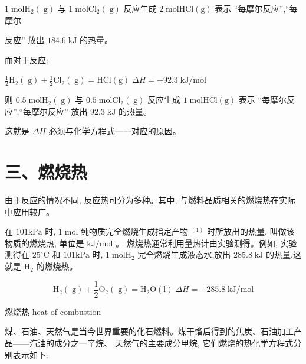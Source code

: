 \documentclass[10pt]{article}
\begin{document}
\(1\mathrm{\;{mol}}{\mathrm{H}}_{2}\left( \mathrm{\;g}\right)\) 与 \(1\mathrm{\;{mol}}{\mathrm{{Cl}}}_{2}\left( \mathrm{\;g}\right)\) 反应生成 \(2\mathrm{\;{mol}}\mathrm{{HCl}}\left( \mathrm{g}\right)\) 表示 “每摩尔反应”,“每摩尔

反应” 放出 \({184.6}\mathrm{\;{kJ}}\) 的热量。

而对于反应:

\(\frac{1}{2}{\mathrm{H}}_{2}\left( \mathrm{\;g}\right) + \frac{1}{2}{\mathrm{{Cl}}}_{2}\left( \mathrm{\;g}\right) = \mathrm{{HCl}}\left( \mathrm{g}\right) \;{\Delta H} = - {92.3}\mathrm{\;{kJ}}/\mathrm{{mol}}\)

则 \({0.5}\mathrm{\;{mol}}{\mathrm{H}}_{2}\left( \mathrm{\;g}\right)\) 与 \({0.5}\mathrm{\;{mol}}{\mathrm{{Cl}}}_{2}\left( \mathrm{\;g}\right)\) 反应生成 \(1\mathrm{\;{mol}}\mathrm{{HCl}}\left( \mathrm{g}\right)\) 表示 “每摩尔反应”,“每摩尔反应” 放出 \({92.3}\mathrm{\;{kJ}}\) 的热量。

这就是 \({\Delta H}\) 必须与化学方程式一一对应的原因。

\section*{三、燃烧热}

由于反应的情况不同, 反应热可分为多种。其中, 与燃料品质相关的燃烧热在实际中应用较广。

在 \({101}\mathrm{{kPa}}\) 时, \(1\mathrm{\;{mol}}\) 纯物质完全燃烧生成指定产物 \({}^{\left( 1\right) }\) 时所放出的热量, 叫做该物质的燃烧热, 单位是 \(\mathrm{{kJ}}/\mathrm{{mol}}\) 。 燃烧热通常利用量热计由实验测得。例如, 实验测得在 \({25}{}^{ \circ }\mathrm{C}\) 和 \({101}\mathrm{{kPa}}\) 时, \(1\mathrm{\;{mol}}{\mathrm{H}}_{2}\) 完全燃烧生成液态水,放出 \({285.8}\mathrm{\;{kJ}}\) 的热量,这就是 \({\mathrm{H}}_{2}\) 的燃烧热。

\[
{\mathrm{H}}_{2}\left( \mathrm{\;g}\right) + \frac{1}{2}{\mathrm{O}}_{2}\left( \mathrm{\;g}\right) = {\mathrm{H}}_{2}\mathrm{O}\left( \mathrm{l}\right) \;{\Delta H} = - {285.8}\mathrm{\;{kJ}}/\mathrm{{mol}}
\]

\begin{mdframed}

燃烧热 heat of combustion

\end{mdframed}

煤、石油、天然气是当今世界重要的化石燃料。煤干馏后得到的焦炭、石油加工产品——汽油的成分之一辛烷、 天然气的主要成分甲烷, 它们燃烧的热化学方程式分别表示如下:
\end{document}
